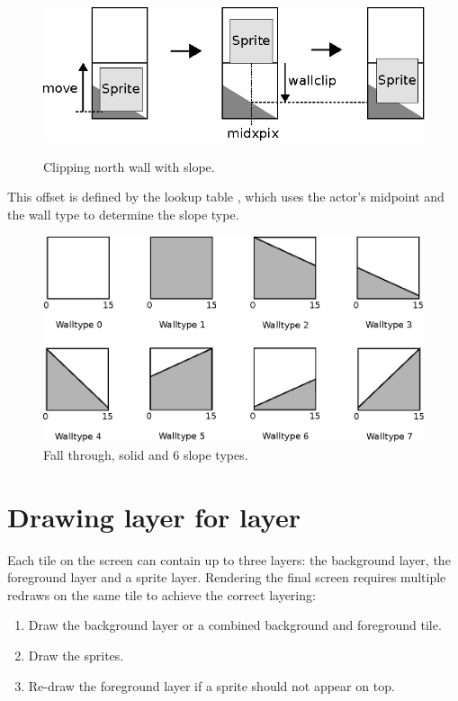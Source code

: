 \documentclass[book.tex]{subfiles}
\begin{document}
\begin{figure}[H]
  \centering
  \includegraphics[width=\textwidth]{imgs/drawings/clipping_north.eps}
  \label{fig:clipping_north}
  \caption{Clipping north wall with slope.}
\end{figure}

This offset is defined by the lookup table , which uses the actor's midpoint and the wall type to determine the slope type.

\par
\begin{figure}[H]
  \centering
  \includegraphics[width=\textwidth]{imgs/drawings/walltype.eps}
  \caption{Fall through, solid and 6 slope types.}
  \label{fig:walltype}
\end{figure}



\par
\begin{minipage}{\textwidth}
  
\end{minipage}
\label{wallclip_array}


\section{Drawing layer for layer}
Each tile on the screen can contain up to three layers: the background layer, the foreground layer and a sprite layer. Rendering the final screen requires multiple redraws on the same tile to achieve the correct layering:
\begin{enumerate}
  \item Draw the background layer or a combined background and foreground tile.
  \item Draw the sprites.
  \item Re-draw the foreground layer if a sprite should not appear on top.
\end{enumerate}
\end{document}
